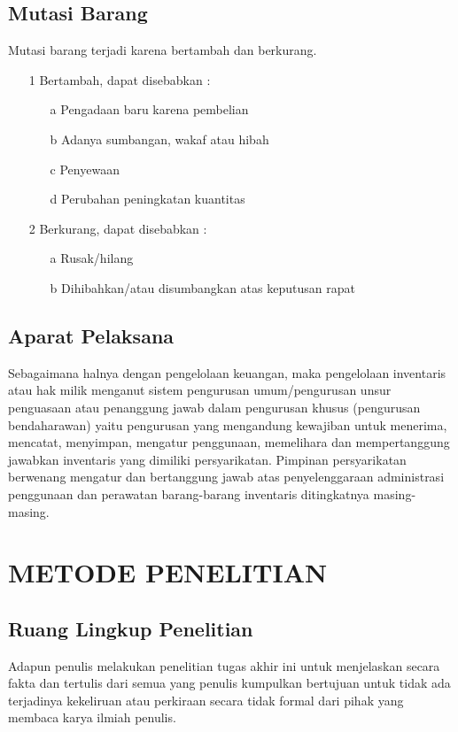 \documentclass{jtetiproposalskripsi}
\begin{document}
\section{Mutasi Barang}
Mutasi barang terjadi karena bertambah dan berkurang.
\begin{itemize}
\item[1]Bertambah, dapat disebabkan :
\begin{itemize}
\item[a]Pengadaan baru karena pembelian
\item[b]Adanya sumbangan, wakaf atau hibah 
\item[c]Penyewaan
\item[d]Perubahan peningkatan kuantitas
\end{itemize}

\item[2]Berkurang, dapat disebabkan :
\begin{itemize}
\item[a]Rusak/hilang
\item[b]Dihibahkan/atau disumbangkan atas keputusan rapat 
\end{itemize}
\end{itemize}

\section{Aparat Pelaksana}
Sebagaimana halnya dengan pengelolaan keuangan, maka pengelolaan inventaris atau hak milik menganut sistem pengurusan umum/pengurusan unsur penguasaan atau penanggung jawab dalam pengurusan khusus (pengurusan bendaharawan) yaitu pengurusan yang   mengandung   kewajiban   untuk   menerima,   mencatat,   menyimpan,   mengatur penggunaan, memelihara dan mempertanggung jawabkan inventaris yang dimiliki persyarikatan. Pimpinan persyarikatan berwenang mengatur dan bertanggung jawab atas penyelenggaraan administrasi penggunaan dan perawatan barang-barang inventaris ditingkatnya masing-masing. 

\chapter{METODE PENELITIAN}
\section{Ruang Lingkup Penelitian}
Adapun penulis melakukan penelitian  tugas akhir  ini untuk menjelaskan secara fakta dan tertulis dari semua yang penulis kumpulkan bertujuan untuk tidak ada terjadinya kekeliruan  atau  perkiraan  secara  tidak  formal  dari  pihak  yang  membaca  karya  ilmiah penulis.
\end{document}

